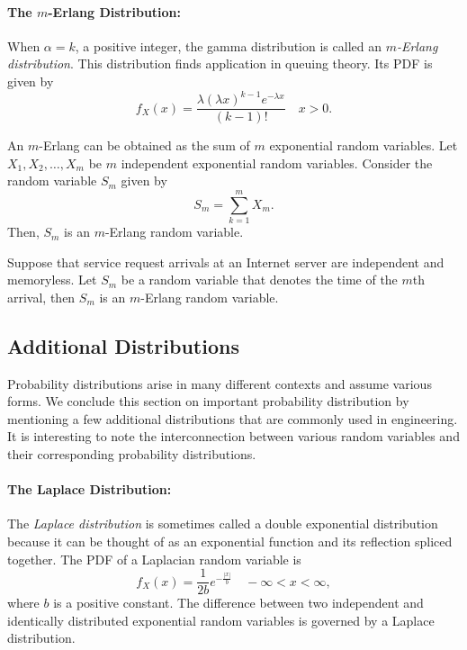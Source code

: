 \paragraph{The $m$-Erlang Distribution:}
When $\alpha = k$, a positive integer, the gamma distribution is called an \emph{$m$-Erlang distribution}.
This distribution finds application in queuing theory.
Its PDF is given by
\begin{equation*}
f_X (x) = \frac{\lambda (\lambda x)^{k - 1} e^{-\lambda x}}{(k-1)!} \quad  x > 0.
\end{equation*}

An $m$-Erlang can be obtained as the sum of $m$ exponential random variables.
Let $X_1, X_2, \ldots, X_m$ be $m$ independent exponential random variables.
Consider the random variable $S_m$ given by
\begin{equation*}
S_m = \sum_{k=1}^m X_m.
\end{equation*}
Then, $S_m$ is an $m$-Erlang random variable.

\begin{example}
Suppose that service request arrivals at an Internet server are independent and memoryless.
Let $S_m$ be a random variable that denotes the time of the $m$th arrival, then $S_m$ is an $m$-Erlang  random variable.
\end{example}

\subsection{Additional Distributions}

Probability distributions arise in many different contexts and assume various forms.
We conclude this section on important probability distribution by mentioning a few additional distributions that are commonly used in engineering.
It is interesting to note the interconnection between various random variables and their corresponding probability distributions.

\paragraph{The Laplace Distribution:}
The \emph{Laplace distribution} is sometimes called a double exponential distribution because it can be thought of as an exponential function and its reflection spliced together.
The PDF of a Laplacian random variable is
\begin{equation*}
f_X (x) = \frac{1}{2b} e^{- \frac{|x|}{b}} \quad - \infty < x < \infty,
\end{equation*}
where $b$ is a positive constant.
The difference between two independent and identically distributed exponential random variables is governed by a Laplace distribution.

